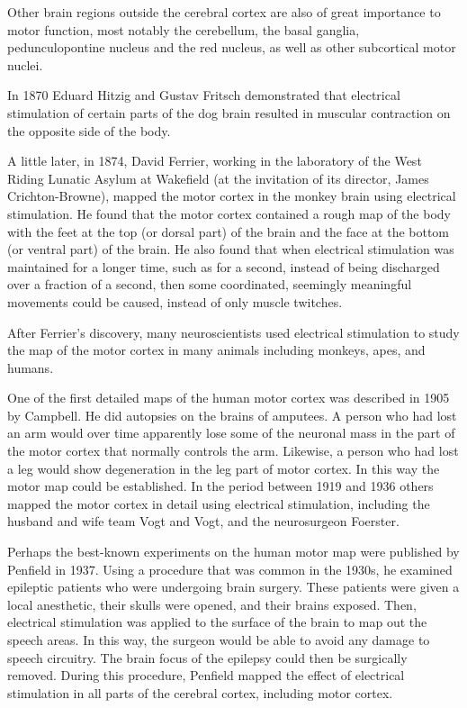 Other brain regions outside the cerebral cortex are also of great importance to motor function, most notably the cerebellum, the basal ganglia, pedunculopontine nucleus and the red nucleus, as well as other subcortical motor nuclei.

In 1870 Eduard Hitzig and Gustav Fritsch demonstrated that electrical stimulation of certain parts of the dog brain resulted in muscular contraction on the opposite side of the body.

A little later, in 1874, David Ferrier, working in the laboratory of the West Riding Lunatic Asylum at Wakefield (at the invitation of its director, James Crichton-Browne), mapped the motor cortex in the monkey brain using electrical stimulation. He found that the motor cortex contained a rough map of the body with the feet at the top (or dorsal part) of the brain and the face at the bottom (or ventral part) of the brain. He also found that when electrical stimulation was maintained for a longer time, such as for a second, instead of being discharged over a fraction of a second, then some coordinated, seemingly meaningful movements could be caused, instead of only muscle twitches.

After Ferrier's discovery, many neuroscientists used electrical stimulation to study the map of the motor cortex in many animals including monkeys, apes, and humans.

One of the first detailed maps of the human motor cortex was described in 1905 by Campbell. He did autopsies on the brains of amputees. A person who had lost an arm would over time apparently lose some of the neuronal mass in the part of the motor cortex that normally controls the arm. Likewise, a person who had lost a leg would show degeneration in the leg part of motor cortex. In this way the motor map could be established. In the period between 1919 and 1936 others mapped the motor cortex in detail using electrical stimulation, including the husband and wife team Vogt and Vogt, and the neurosurgeon Foerster.

Perhaps the best-known experiments on the human motor map were published by Penfield in 1937. Using a procedure that was common in the 1930s, he examined epileptic patients who were undergoing brain surgery. These patients were given a local anesthetic, their skulls were opened, and their brains exposed. Then, electrical stimulation was applied to the surface of the brain to map out the speech areas. In this way, the surgeon would be able to avoid any damage to speech circuitry. The brain focus of the epilepsy could then be surgically removed. During this procedure, Penfield mapped the effect of electrical stimulation in all parts of the cerebral cortex, including motor cortex.

